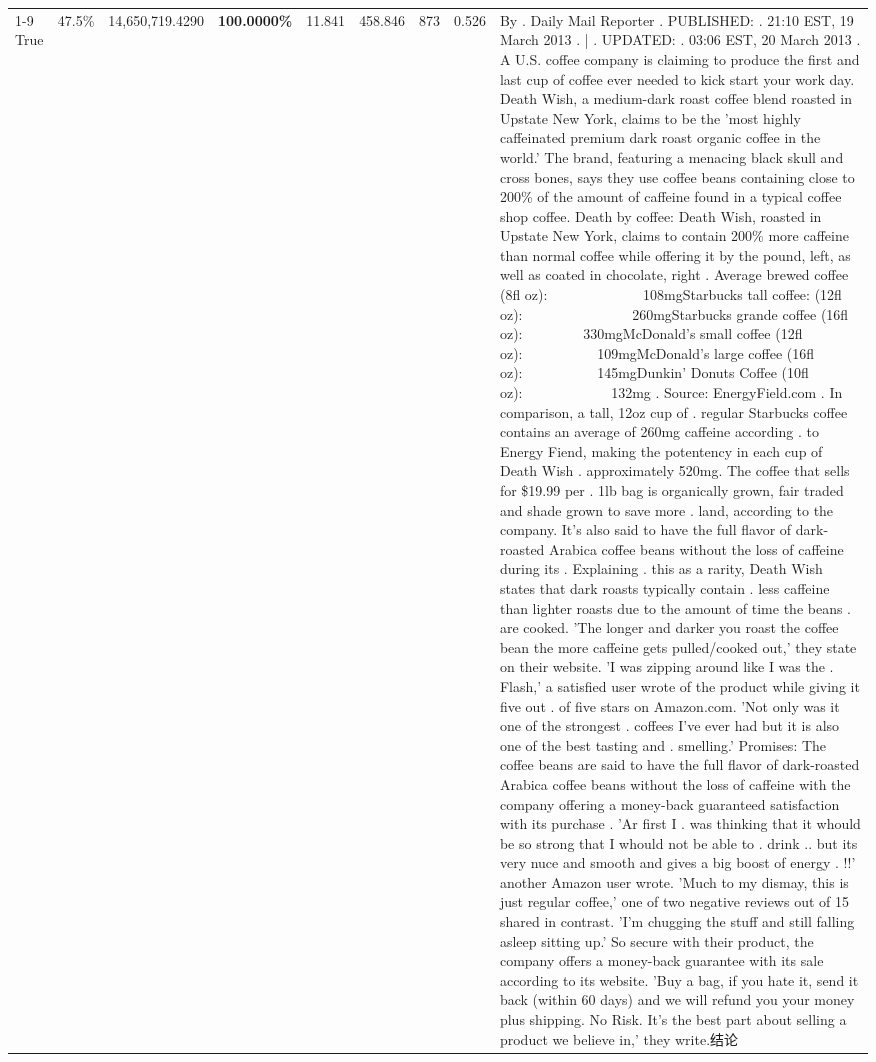 \begin{table}[H]
{\begin{tabular}{lllrlllll}
\cline{1-9}
True & 47.5\% & 14,650,719.4290 & \bfseries \color{red} 100.0000\% & 11.841 & 458.846 & 873 & 0.526 & By . Daily Mail Reporter . PUBLISHED: . 21:10 EST, 19 March 2013 . | . UPDATED: . 03:06 EST, 20 March 2013 . A U.S. coffee company is claiming to produce the first and last cup of coffee ever needed to kick start your work day. Death Wish, a medium-dark roast coffee blend roasted in Upstate New York, claims to be the 'most highly caffeinated premium dark roast organic coffee in the world.' The brand, featuring a menacing black skull and cross bones, says they use coffee beans containing close to 200\% of the amount of caffeine found in a typical coffee shop coffee. Death by coffee: Death Wish, roasted in Upstate New York, claims to contain 200\% more caffeine than normal coffee while offering it by the pound, left, as well as coated in chocolate, right . Average brewed coffee (8fl oz):              108mgStarbucks tall coffee: (12fl oz):                260mgStarbucks grande coffee (16fl oz):         330mgMcDonald's small coffee (12fl oz):           109mgMcDonald's large coffee (16fl oz):           145mgDunkin' Donuts Coffee (10fl oz):             132mg . Source: EnergyField.com . In comparison, a tall, 12oz cup of . regular Starbucks coffee contains an average of 260mg caffeine according . to Energy Fiend, making the potentency in each cup of Death Wish . approximately 520mg. The coffee that sells for \$19.99 per . 1lb bag is organically grown, fair traded and shade grown to save more . land, according to the company. It's also said to have the full flavor of dark-roasted Arabica coffee beans without the loss of caffeine during its . Explaining . this as a rarity, Death Wish states that dark roasts typically contain . less caffeine than lighter roasts due to the amount of time the beans . are cooked. 'The longer and darker you roast the coffee bean the more caffeine gets pulled/cooked out,' they state on their website. 'I was zipping around like I was the . Flash,' a satisfied user wrote of the product while giving it five out . of five stars on Amazon.com. 'Not only was it one of the strongest . coffees I've ever had but it is also one of the best tasting and . smelling.’ Promises: The coffee beans are said to have the full flavor of dark-roasted Arabica coffee beans without the loss of caffeine with the company offering a money-back guaranteed satisfaction with its purchase . 'Ar first I . was thinking that it whould be so strong that I whould not be able to . drink .. but its very nuce and smooth and gives a big boost of energy . !!' another Amazon user wrote. 'Much to my dismay, this is just regular coffee,' one of two negative reviews out of 15 shared in contrast. 'I'm chugging the stuff and still falling asleep sitting up.' So secure with their product, the company offers a money-back guarantee with its sale according to its website. 'Buy a bag, if you hate it, send it back (within 60 days) and we will refund you your money plus shipping. No Risk. It’s the best part about selling a product we believe in,' they write.结论 \\

\end{tabular}}
\end{table}

